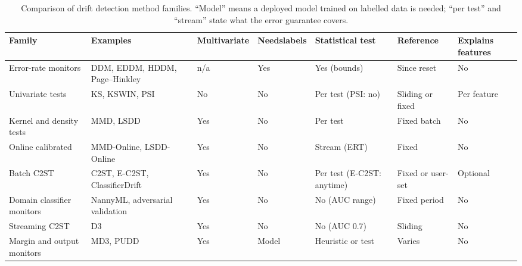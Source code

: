 \begin{table}[!htbp]
\centering
\caption[Comparison of drift detection method families]{Comparison of drift detection method families. ``Model'' means a deployed model trained on labelled data is needed; ``per test'' and ``stream'' state what the error guarantee covers.}
\label{tab:family-comparison}
\footnotesize
\setlength{\tabcolsep}{3pt}
\begin{tabular}{>{\raggedright\arraybackslash}p{2.6cm}>{\raggedright\arraybackslash}p{2.6cm}>{\raggedright\arraybackslash}p{1.3cm}>{\raggedright\arraybackslash}p{1.3cm}>{\raggedright\arraybackslash}p{2.0cm}>{\raggedright\arraybackslash}p{1.6cm}>{\raggedright\arraybackslash}p{1.6cm}}
\toprule
\raggedright Family & \raggedright Examples & \raggedright Multi\-variate & \raggedright Needs\newline labels & \raggedright Statistical test & \raggedright Reference & \raggedright Explains features \tabularnewline
\midrule
\raggedright Error-rate monitors & \raggedright DDM, EDDM, HDDM, Page--Hinkley & \raggedright n/a & \raggedright Yes & \raggedright Yes (bounds) & \raggedright Since reset & \raggedright No \tabularnewline
\addlinespace
\raggedright Univariate tests & \raggedright KS, KSWIN, PSI & \raggedright No & \raggedright No & \raggedright Per test (PSI: no) & \raggedright Sliding or fixed & \raggedright Per feature \tabularnewline
\addlinespace
\raggedright Kernel and density tests & \raggedright MMD, LSDD & \raggedright Yes & \raggedright No & \raggedright Per test & \raggedright Fixed batch & \raggedright No \tabularnewline
\addlinespace
\raggedright Online calibrated & \raggedright MMD-Online, LSDD-Online & \raggedright Yes & \raggedright No & \raggedright Stream (ERT) & \raggedright Fixed & \raggedright No \tabularnewline
\addlinespace
\raggedright Batch C2ST & \raggedright C2ST, E-C2ST, ClassifierDrift & \raggedright Yes & \raggedright No & \raggedright Per test (E-C2ST: anytime) & \raggedright Fixed or user-set & \raggedright Optional \tabularnewline
\addlinespace
\raggedright Domain classifier monitors & \raggedright NannyML, adversarial validation & \raggedright Yes & \raggedright No & \raggedright No (AUC range) & \raggedright Fixed period & \raggedright No \tabularnewline
\addlinespace
\raggedright Streaming C2ST & \raggedright D3 & \raggedright Yes & \raggedright No & \raggedright No (AUC 0.7) & \raggedright Sliding & \raggedright No \tabularnewline
\addlinespace
\raggedright Margin and output monitors & \raggedright MD3, PUDD & \raggedright Yes & \raggedright Model & \raggedright Heuristic or test & \raggedright Varies & \raggedright No \tabularnewline

\end{tabular}
\end{table}
